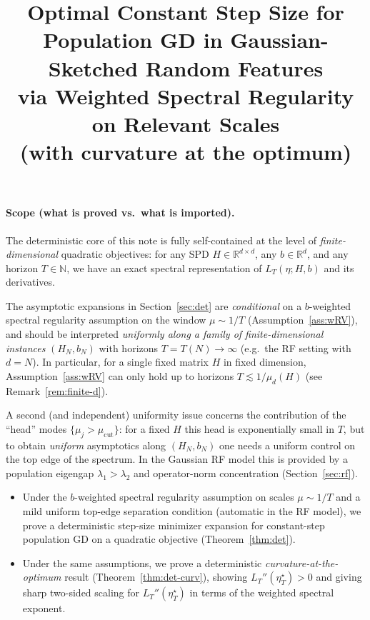 \documentclass[11pt]{article}
\title{Optimal Constant Step Size for Population GD in Gaussian-Sketched Random Features\\
via Weighted Spectral Regularity on Relevant Scales\\
\small (with curvature at the optimum)}
\author{}
\date{}
\begin{document}
\maketitle

\paragraph{Scope (what is proved vs.\ what is imported).}
The deterministic core of this note is fully self-contained at the level of
\emph{finite-dimensional} quadratic objectives: for any SPD $H\in\mathbb R^{d\times d}$,
any $b\in\mathbb R^d$, and any horizon $T\in\mathbb N$, we have an exact spectral
representation of $L_T(\eta;H,b)$ and its derivatives.

The asymptotic expansions in Section~\ref{sec:det} are \emph{conditional} on a
$b$-weighted spectral regularity assumption on the window $\mu\sim 1/T$
(Assumption~\ref{ass:wRV}), and should be interpreted \emph{uniformly along a family of
finite-dimensional instances} $(H_N,b_N)$ with horizons $T=T(N)\to\infty$ (e.g.\ the RF
setting with $d=N$). In particular, for a single fixed matrix $H$ in fixed dimension,
Assumption~\ref{ass:wRV} can only hold up to horizons $T\lesssim 1/\mu_d(H)$
(see Remark~\ref{rem:finite-d}).

A second (and independent) uniformity issue concerns the contribution of the
``head'' modes $\{\mu_j>\mu_{\mathrm{cut}}\}$: for a fixed $H$ this head is exponentially
small in $T$, but to obtain \emph{uniform} asymptotics along $(H_N,b_N)$ one needs a
uniform control on the top edge of the spectrum. In the Gaussian RF model this is
provided by a population eigengap $\lambda_1>\lambda_2$ and operator-norm concentration
(Section~\ref{sec:rf}).

\begin{itemize}[leftmargin=*]
\item[(D1)] Under the $b$-weighted spectral regularity assumption on scales $\mu\sim 1/T$
and a mild uniform top-edge separation condition (automatic in the RF model),
we prove a deterministic step-size minimizer expansion for constant-step population GD
on a quadratic objective (Theorem~\ref{thm:det}).
\item[(D2)] Under the same assumptions, we prove a deterministic \emph{curvature-at-the-optimum}
result (Theorem~\ref{thm:det-curv}), showing $L_T''(\eta_T^\star)>0$ and giving sharp
two-sided scaling for $L_T''(\eta_T^\star)$ in terms of the weighted spectral exponent.
\end{itemize}
\end{document}
